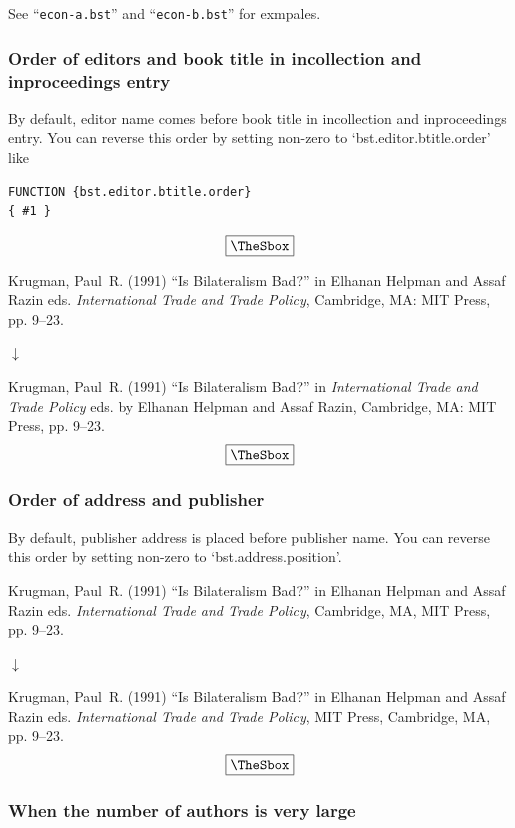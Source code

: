 \documentclass[10pt]{article}
\newenvironment{Frame}%
{\setlength{\fboxsep}{15pt}
\setlength{\mylength}{\linewidth}%
\addtolength{\mylength}{-2\fboxsep}%
\addtolength{\mylength}{-2\fboxrule}%
\Sbox
\minipage{\mylength}%
\setlength{\abovedisplayskip}{0pt}%
\setlength{\belowdisplayskip}{0pt}%
}%
{\endminipage\endSbox
\[\fbox{\TheSbox}\]}
\begin{document}
See ``\texttt{econ-a.bst}'' and ``\texttt{econ-b.bst}'' for exmpales.


\subsubsection{Order of editors and book title in incollection and inproceedings entry}

By default, editor name comes before book title in incollection and
inproceedings entry. You can reverse this order by
setting non-zero to `bst.editor.btitle.order' like
\begin{Frame}
\begin{verbatim}
FUNCTION {bst.editor.btitle.order}
{ #1 }
\end{verbatim}
\end{Frame}


\begin{Frame}
Krugman, Paul~R. (1991) ``Is Bilateralism Bad?'' in Elhanan Helpman and Assaf
  Razin eds.  {\it International Trade and Trade Policy}, Cambridge, MA: MIT
  Press, pp. 9--23.
\begin{center}
 $\downarrow$
\end{center} 
Krugman, Paul~R. (1991) ``Is Bilateralism Bad?'' in  {\it International Trade
and Trade Policy}  eds. by Elhanan Helpman and Assaf Razin, Cambridge, MA:
MIT Press, pp. 9--23.
\end{Frame}

\subsubsection{Order of address and publisher}

By default, publisher address is placed before publisher name.  You can
reverse this order by setting non-zero to `bst.address.position'.
\begin{Frame}
Krugman, Paul~R. (1991) ``Is Bilateralism Bad?'' in Elhanan Helpman and
  Assaf Razin eds.  {\it International Trade and Trade Policy},
  Cambridge, MA, MIT Press, pp. 9--23.
\begin{center}
 $\downarrow$
\end{center} 
Krugman, Paul~R. (1991) ``Is Bilateralism Bad?'' in Elhanan Helpman and Assaf
  Razin eds.   {\it International Trade and Trade Policy}, MIT Press,
  Cambridge, MA, pp. 9--23.
\end{Frame}

\subsubsection{When the number of authors is very large}
\end{document}
